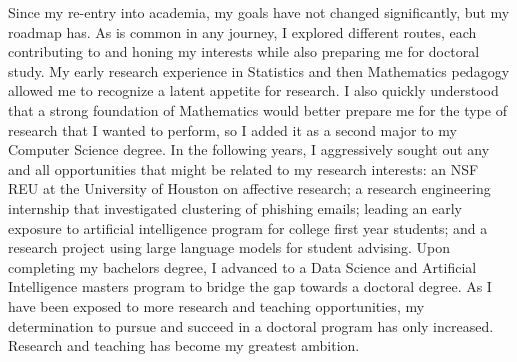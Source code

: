 \documentclass[12pt]{article}
\begin{document}
Since my re-entry into academia, my goals have not changed significantly, but my
roadmap has. As is common in any journey, I explored different routes, each
contributing to and honing my interests while also preparing me for doctoral
study.  My early research experience in Statistics and then Mathematics pedagogy
allowed me to recognize a latent appetite for research.  I also quickly understood
that a strong foundation of Mathematics would better prepare me for the type of
research that I wanted to perform, so I added it as a second major to my Computer
Science degree.  In the following years, I aggressively sought out any
and all opportunities that might be related to my research
interests: an NSF REU at the University of Houston on affective
research; a research engineering internship that investigated
clustering of phishing emails; leading an early exposure to artificial
intelligence program for college first year students; and a research project
using large language models for student advising.  Upon completing my bachelors
degree, I advanced to a Data Science and Artificial Intelligence
masters program to bridge the gap towards a doctoral degree.  As I have been exposed to
more research and teaching opportunities, my determination to pursue and succeed
in a doctoral program has only increased.  Research and teaching has become my
greatest ambition.
\end{document}
